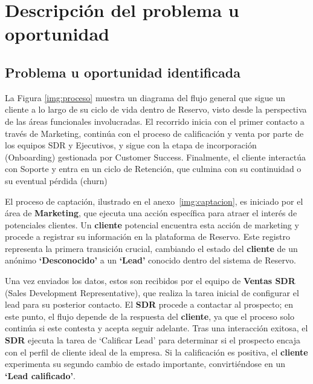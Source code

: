 
\section{Descripción del problema u oportunidad}

\subsection{Problema u oportunidad identificada}


La Figura \ref{img:proceso} muestra un diagrama del flujo general que sigue un cliente a lo largo de su ciclo de vida dentro de Reservo, visto desde la perspectiva de las áreas funcionales involucradas. El recorrido inicia con el primer contacto a través de Marketing, continúa con el proceso de calificación y venta por parte de los equipos SDR y Ejecutivos, y sigue con la etapa de incorporación (Onboarding) gestionada por Customer Success. Finalmente, el cliente interactúa con Soporte y entra en un ciclo de Retención, que culmina con su continuidad o su eventual pérdida (churn)


El proceso de captación, ilustrado en el anexo~\ref{img:captacion}, es iniciado por el área de \textbf{Marketing}, que ejecuta una acción específica para atraer el interés de potenciales clientes. Un \textbf{cliente} potencial encuentra esta acción de marketing y procede a registrar su información en la plataforma de Reservo. Este registro representa la primera transición crucial, cambiando el estado del \textbf{cliente} de un anónimo \textbf{`Desconocido'} a un \textbf{`Lead'} conocido dentro del sistema de Reservo.

Una vez enviados los datos, estos son recibidos por el equipo de \textbf{Ventas SDR} (Sales Development Representative), que realiza la tarea inicial de configurar el lead para su posterior contacto. El \textbf{SDR} procede a contactar al prospecto; en este punto, el flujo depende de la respuesta del \textbf{cliente}, ya que el proceso solo continúa si este contesta y acepta seguir adelante. Tras una interacción exitosa, el \textbf{SDR} ejecuta la tarea de `Calificar Lead' para determinar si el prospecto encaja con el perfil de cliente ideal de la empresa. Si la calificación es positiva, el \textbf{cliente} experimenta su segundo cambio de estado importante, convirtiéndose en un \textbf{`Lead calificado'}.


